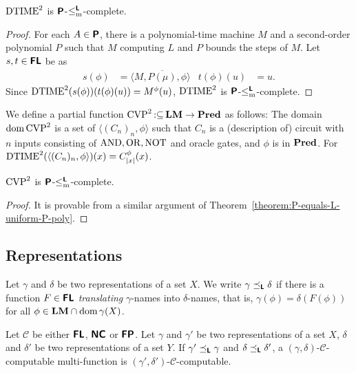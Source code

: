 \documentclass[envcountsame,orivec,oribibl]{llncs}
\newcommand{\pcolon}{\mathpunct{\,:\subseteq}}
\begin{document}
\begin{lemma}
 $\mathrm{DTIME}^2$ is $\text{\bfseries \sffamily \upshape P}$-$\leq _{\mathrm{m}} ^{\text{\bfseries \sffamily \upshape L}}$-complete.
\end{lemma}

\begin{proof}
 For each $A \in \text{\bfseries \sffamily \upshape P}$, there is a polynomial-time machine $M$ and a second-order polynomial $P$ such that $M$ computing $L$ and $P$ bounds the steps of $M$.
 Let $s, t \in \text{\bfseries \sffamily \upshape FL}$ be as
 \begin{align}
  s(\phi) &= \langle M, \overline{P(\mu)}, \phi \rangle
  &
  t(\phi)(u) &= u.
 \end{align}
 Since  $\mathrm{DTIME}^2(s(\phi))(t(\phi)(u)) = M^\phi (u)$,
 $\mathrm{DTIME}^2$ is $\text{\bfseries \sffamily \upshape P}$-$\leq _{\mathrm{m}} ^{\text{\bfseries \sffamily \upshape L}}$-complete.
\end{proof}


We define a partial function  $\probCVPtwo \pcolon \LM \to \Pred$ as follows:
The domain $\mathop{\rm dom} \mathrm{CVP}^2$ is a set of $\langle (C_n)_n, \phi \rangle$
such that $C_n$ is a (description of) circuit with $n$ inputs consisting of $\mathrm{AND}, \mathrm{OR}, \mathrm{NOT}$ and oracle gates, and $\phi$ is in $\mathbf{Pred}$.
For $\mathrm{DTIME}^2(\langle (C_n)_n,  \phi \rangle)(x) = C^\phi_{|x|}(x)$.

\begin{lemma}
 $\mathrm{CVP}^2$ is $\text{\bfseries \sffamily \upshape P}$-$\leq _{\mathrm{m}} ^{\text{\bfseries \sffamily \upshape L}}$-complete.
\end{lemma}

\begin{proof}
 It is provable from a similar argument of Theorem~\ref{theorem:P-equals-L-uniform-P-poly}.
\end{proof}



\subsection{Representations}
\newcommand{\transL}{\preceq_\classLtwo}


\begin{definition}
Let $\gamma$ and $\delta$ be two representations of a set $X$.
We write $\gamma \transL \delta$ if
there is a function $F \in \text{\bfseries \sffamily \upshape FL}$ \emph{translating} $\gamma$-names
into $\delta$-names, that is, $\gamma(\phi) = \delta(F(\phi))$ 
for all $\phi \in \mathbf{LM} \cap \mathop{\rm dom} \gamma(X)$.
\end{definition}

\begin{lemma}
 Let $\mathcal{C}$ be either $\text{\bfseries \sffamily \upshape FL}$, $\text{\bfseries \sffamily \upshape NC}$ or
 $\text{\bfseries \sffamily \upshape FP}$.
 Let $\gamma$ and $\gamma'$ be two representations of a set $X$, 
 $\delta$ and $\delta'$ be two representations of a set $Y$.
 If $\gamma' \transL \gamma$ and $\delta \transL \delta'$,
 a $(\gamma, \delta)$-$\mathcal C$-computable multi-function is
 $(\gamma', \delta')$-$\mathcal C$-computable.
\end{lemma}
\end{document}
